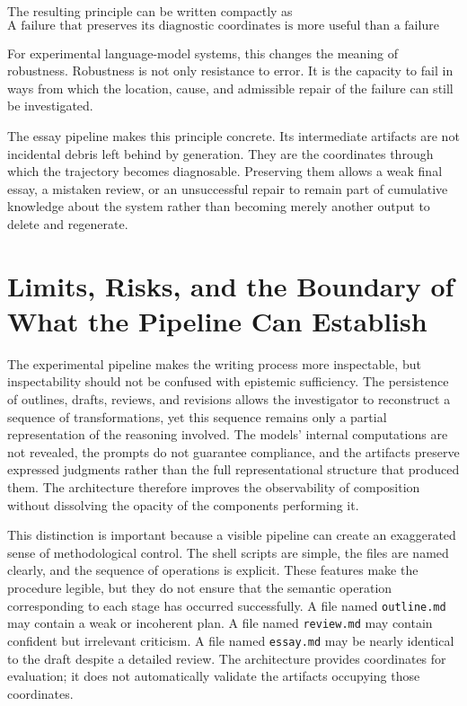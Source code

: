 \documentclass[11pt]{article}
\begin{document}
The resulting principle can be written compactly as
\[
    \boxed{
    \text{A failure that preserves its diagnostic coordinates
    is more useful than a failure that destroys its own history.}
    }
\]

For experimental language-model systems, this changes the meaning of robustness. Robustness is not only resistance to error. It is the capacity to fail in ways from which the location, cause, and admissible repair of the failure can still be investigated.

The essay pipeline makes this principle concrete. Its intermediate artifacts are not incidental debris left behind by generation. They are the coordinates through which the trajectory becomes diagnosable. Preserving them allows a weak final essay, a mistaken review, or an unsuccessful repair to remain part of cumulative knowledge about the system rather than becoming merely another output to delete and regenerate.

\section{Limits, Risks, and the Boundary of What the Pipeline Can Establish}

The experimental pipeline makes the writing process more inspectable, but inspectability should not be confused with epistemic sufficiency. The persistence of outlines, drafts, reviews, and revisions allows the investigator to reconstruct a sequence of transformations, yet this sequence remains only a partial representation of the reasoning involved. The models' internal computations are not revealed, the prompts do not guarantee compliance, and the artifacts preserve expressed judgments rather than the full representational structure that produced them. The architecture therefore improves the observability of composition without dissolving the opacity of the components performing it.

This distinction is important because a visible pipeline can create an exaggerated sense of methodological control. The shell scripts are simple, the files are named clearly, and the sequence of operations is explicit. These features make the procedure legible, but they do not ensure that the semantic operation corresponding to each stage has occurred successfully. A file named \texttt{outline.md} may contain a weak or incoherent plan. A file named \texttt{review.md} may contain confident but irrelevant criticism. A file named \texttt{essay.md} may be nearly identical to the draft despite a detailed review. The architecture provides coordinates for evaluation; it does not automatically validate the artifacts occupying those coordinates.
\end{document}
